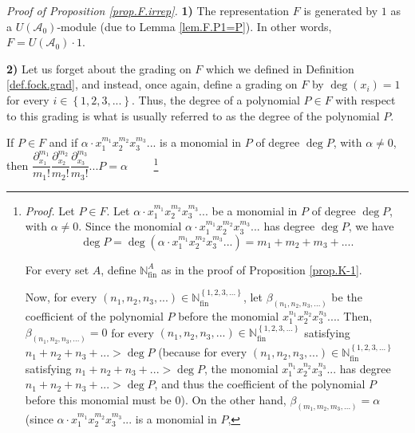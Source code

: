 \documentclass[etingof-lie.tex]{subfiles}
\begin{document}
\textit{Proof of Proposition \ref{prop.F.irrep}.} \textbf{1)} The
representation $F$ is generated by $1$ as a $U\left(  \mathcal{A}_{0}\right)
$-module (due to Lemma \ref{lem.F.P1=P}). In other words, $F=U\left(
\mathcal{A}_{0}\right)  \cdot1$.

\textbf{2)} Let us forget about the grading on $F$ which we defined in
Definition \ref{def.fock.grad}, and instead, once again, define a grading on
$F$ by $\deg\left(  x_{i}\right)  =1$ for every $i\in\left\{
1,2,3,...\right\}  $. Thus, the degree of a polynomial $P\in F$ with respect
to this grading is what is usually referred to as the degree of the polynomial
$P$.

\begin{verlong}
If $P\in F$ and if $\alpha\cdot x_{1}^{m_{1}}x_{2}^{m_{2}}x_{3}^{m_{3}}...$ is
a monomial in $P$ of degree $\deg P$, with $\alpha\neq0$, then $\dfrac
{\partial_{x_{1}}^{m_{1}}}{m_{1}!}\dfrac{\partial_{x_{2}}^{m_{2}}}{m_{2}%
!}\dfrac{\partial_{x_{3}}^{m_{3}}}{m_{3}!}...P=\alpha$%
\ \ \ \ \footnote{\textit{Proof.} Let $P\in F$. Let $\alpha\cdot x_{1}^{m_{1}%
}x_{2}^{m_{2}}x_{3}^{m_{3}}...$ be a monomial in $P$ of degree $\deg P$, with
$\alpha\neq0$. Since the monomial $\alpha\cdot x_{1}^{m_{1}}x_{2}^{m_{2}}%
x_{3}^{m_{3}}...$ has degree $\deg P$, we have%
\[
\deg P=\deg\left(  \alpha\cdot x_{1}^{m_{1}}x_{2}^{m_{2}}x_{3}^{m_{3}%
}...\right)  =m_{1}+m_{2}+m_{3}+....
\]
\par
For every set $A$, define $\mathbb{N}_{\operatorname*{fin}}^{A}$ as in the
proof of Proposition \ref{prop.K-1}.
\par
Now, for every $\left(  n_{1},n_{2},n_{3},...\right)  \in\mathbb{N}%
_{\operatorname*{fin}}^{\left\{  1,2,3,...\right\}  }$, let $\beta_{\left(
n_{1},n_{2},n_{3},...\right)  }$ be the coefficient of the polynomial $P$
before the monomial $x_{1}^{n_{1}}x_{2}^{n_{2}}x_{3}^{n_{3}}...$. Then,
$\beta_{\left(  n_{1},n_{2},n_{3},...\right)  }=0$ for every $\left(
n_{1},n_{2},n_{3},...\right)  \in\mathbb{N}_{\operatorname*{fin}}^{\left\{
1,2,3,...\right\}  }$ satisfying $n_{1}+n_{2}+n_{3}+...>\deg P$ (because for
every $\left(  n_{1},n_{2},n_{3},...\right)  \in\mathbb{N}%
_{\operatorname*{fin}}^{\left\{  1,2,3,...\right\}  }$ satisfying $n_{1}%
+n_{2}+n_{3}+...>\deg P$, the monomial $x_{1}^{n_{1}}x_{2}^{n_{2}}x_{3}%
^{n_{3}}...$ has degree $n_{1}+n_{2}+n_{3}+...>\deg P$, and thus the
coefficient of the polynomial $P$ before this monomial must be $0$). On the
other hand, $\beta_{\left(  m_{1},m_{2},m_{3},...\right)  }=\alpha$ (since
$\alpha\cdot x_{1}^{m_{1}}x_{2}^{m_{2}}x_{3}^{m_{3}}...$ is a monomial in $P$,
}
\end{verlong}
\end{document}
